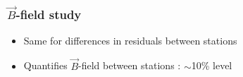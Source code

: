 \documentclass[compress]{beamer}
\begin{document}
\begin{frame}
\frametitle{$\vec{B}$-field study}

\begin{itemize}
\item Same for differences in residuals between stations 
\item Quantifies $\vec{B}$-field between stations : $\sim$10\% level
\end{itemize}


\end{frame}
\end{document}
